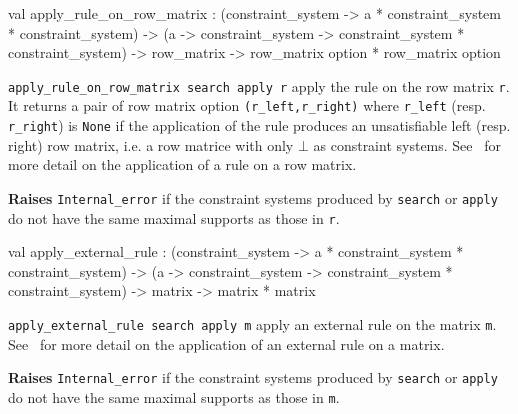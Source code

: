 \label{val:Constraint-underscoresystem.apply-underscorerule-underscoreon-underscorerow-underscorematrix}\begin{ocamldoccode}
val apply_rule_on_row_matrix :
  (constraint_system ->
   {\textquotesingle}a * constraint_system *
   constraint_system) ->
  ({\textquotesingle}a ->
   constraint_system ->
   constraint_system * constraint_system) ->
  row_matrix ->
  row_matrix option * row_matrix option
\end{ocamldoccode}
\begin{ocamldocdescription}
{\tt{apply\_rule\_on\_row\_matrix search apply r}} apply the rule on the row matrix {\tt{r}}. 
    It returns a pair of row matrix option {\tt{(r\_left,r\_right)}} where {\tt{r\_left}} (resp. {\tt{r\_right}})
    is {\tt{None}} if the application of the rule produces an unsatisfiable left (resp. right) row matrix, 
    i.e. a row matrice with only $\bot$  as constraint systems.
    See~ for more detail on the application of a rule on a row matrix. 

{\bf Raises} {\tt{Internal\_error}} if the constraint systems produced by {\tt{search}} or {\tt{apply}} 
    do not have the same maximal supports as those in {\tt{r}}.


\end{ocamldocdescription}




\label{val:Constraint-underscoresystem.apply-underscoreexternal-underscorerule}\begin{ocamldoccode}
val apply_external_rule :
  (constraint_system ->
   {\textquotesingle}a * constraint_system *
   constraint_system) ->
  ({\textquotesingle}a ->
   constraint_system ->
   constraint_system * constraint_system) ->
  matrix ->
  matrix * matrix
\end{ocamldoccode}
\begin{ocamldocdescription}
{\tt{apply\_external\_rule search apply m}} apply an external rule on the matrix {\tt{m}}. 
    See~ for more detail on the application of an external rule on a matrix. 

{\bf Raises} {\tt{Internal\_error}} if the constraint systems produced by {\tt{search}} or {\tt{apply}} 
    do not have the same maximal supports as those in {\tt{m}}.


\end{ocamldocdescription}




